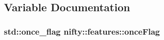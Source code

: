 \subsection{Variable Documentation}
\hypertarget{namespacenifty_1_1features_af5770cdfb4d70324029cf0f8a7061e69}{}
\subsubsection[{once\+Flag}]{\setlength{\rightskip}{0pt plus 5cm}std\+::once\+\_\+flag nifty\+::features\+::once\+Flag}\label{namespacenifty_1_1features_af5770cdfb4d70324029cf0f8a7061e69}
